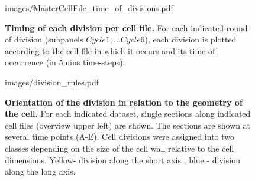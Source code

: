 \documentclass[11pt,a4paper, draft]{article}
\begin{document}
%
\begin{figure}[htbp]
	\begin{center}
	\begin{overpic}[width=.66\linewidth]{images/MasterCellFile_time_of_divisions.pdf}
	\end{overpic}
\caption[Timing of each division per cell file.]
{{\bf Timing of each division per cell file.} For each indicated round of division (subpanels $Cycle 1, ... Cycle 6$), each division is plotted according to the cell file in which it occurs and its time of occurrence (in 5mins  time-steps). }
	\label{fig:mastertimediv}
	\end{center}
\end{figure}
%
\clearpage


%
\begin{figure}[htbp]
	\begin{overpic}[width=1.\linewidth]{images/division_rules.pdf}
	\end{overpic}
\caption[Orientation of the division in relation to the geometry of the cell.]
{{\bf Orientation of the division in relation to the geometry of the cell.} For each indicated dataset, single sections along indicated cell files (overview upper left) are shown. The sections are shown at several time points (A-E). Cell divisions were assigned into two classes depending on the size of the cell wall relative to the cell dimensions. Yellow- division along the short axis , blue - division along the long axis. }
	\label{fig:divrules}
\end{figure}
%
\clearpage
\end{document}
